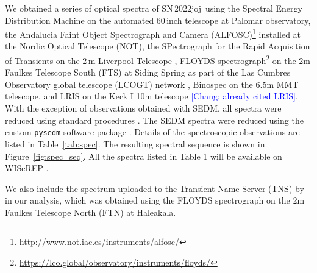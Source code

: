 \documentclass[twocolumn]{aastex631}
\newcommand{\sn}{SN\,2022joj}
\newcommand{\chang}[1]{\textcolor{blue}{[Chang: #1]}}
\begin{document}
\begin{CJK*}{UTF8}{gbsn}
We obtained a series of optical spectra of \sn\ using the Spectral Energy Distribution Machine \citep[SEDM;][]{SEDM_2018} on the automated 60\,inch telescope \citep[P60;][]{P60_2006} at Palomar observatory, the Andalucia Faint Object Spectrograph and Camera (ALFOSC)\footnote{\url{http://www.not.iac.es/instruments/alfosc/}} installed at the Nordic Optical Telescope (NOT), the SPectrograph for the Rapid Acquisition of Transients \citep[SPRAT;][]{SPRAT_2014} on the 2\,m Liverpool Telescope \citep[LT;][]{LT_2004}, FLOYDS spectrograph\footnote{\url{https://lco.global/observatory/instruments/floyds/}} on the 2m Faulkes Telescope South (FTS) at Siding Spring as part of the Las Cumbres Observatory global telescope (LCOGT) network \citep{LCOGT_2013}, Binospec \citep{Binospec_2019} on the 6.5m MMT telescope, and LRIS on the Keck I 10m telescope \chang{already cited LRIS}. With the exception of observations obtained with SEDM, all spectra were reduced using standard procedures \citep[e.g.,][]{Matheson_2000}. The SEDM spectra were reduced using the custom \texttt{pysedm} software package \citep{Rigault_pysedm_2019}. Details of the spectroscopic observations are listed in Table~\ref{tab:spec}. The resulting spectral sequence is shown in Figure~\ref{fig:spec_seq}. All the spectra listed in Table 1 will be available on WISeREP \citep{wiserep_2012}.

We also include the spectrum uploaded to the Transient Name Server (TNS) by \citet{Newsome_2022TNSCR} in our analysis, which was obtained using the FLOYDS spectrograph on the 2m Faulkes Telescope North (FTN) at Haleakala.


\end{CJK*}
\end{document}
